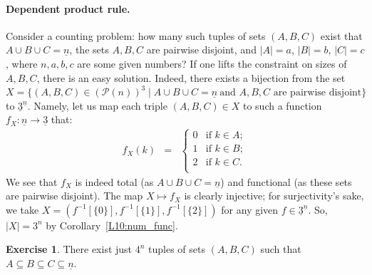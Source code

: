 \documentclass[12pt,notitlepage]{article}
\theoremstyle{plain}
\theoremstyle{definition}
\newtheorem{exc}[thm]{Exercise}
\theoremstyle{plain}
\newcommand{\sbs}{\subseteq}
\newcommand{\mP}{\mathcal{P}}
\newcommand{\ul}[1]{\underline{#1}}
\newcommand{\1}{\mathbf{1}}
\newcommand{\0}{\mathbf{0}}
\newcommand{\mcomm}[1]{}
\begin{document}
\mcomm{The following subsection is logically necessary, but it may be omitted for most audiences. Then, of course, the respective arguments in classwork problems remain intuitive at best.}
\paragraph{Dependent product rule.}
Consider a counting problem: how many such tuples of sets $(A, B, C)$ exist that $A \cup B \cup C = \ul{n}$, the sets $A, B, C$ are pairwise disjoint, and $|A| = a$, $|B| = b$, $|C| = c$, where $n, a, b, c$ are some given numbers? If one lifts the constraint on sizes of $A, B, C$, there is an easy solution. Indeed, there exists a bijection from the set $X = \{ (A, B, C) \in (\mP(n))^3 \mid A \cup B \cup C = \ul{n}\ \mbox{and $A, B, C$ are pairwise disjoint} \}$ to $\ul{3}^{\ul{n}}$. Namely, let us map each triple $(A, B, C) \in X$ to such a function $f_X\colon \ul{n} \to \ul{3}$ that:
$$
\begin{array}{rcll}
f_X(k) &=& \begin{cases}
			0&\mbox{if } k \in A;\\
			1&\mbox{if } k \in B;\\
			2&\mbox{if } k \in C.\\
		\end{cases}
\end{array}
$$
We see that $f_X$ is indeed total (as $A \cup B \cup C = \ul{n}$) and functional (as these sets are pairwise disjoint). The map $X \mapsto f_X$  is clearly injective; for surjectivity's sake, we take $X = (f^{-1}[\{0\}], f^{-1}[\{1\}], f^{-1}[\{2\}])$ for any given $f \in \ul{3}^{\ul{n}}$. So, $|X| = 3^n$ by Corollary~\ref{L10:num_func}.

\begin{exc}
There exist just $4^n$ tuples of sets $(A, B, C)$ such that $A \sbs B \sbs C \sbs \ul{n}$. 
\end{exc}
\end{document}
